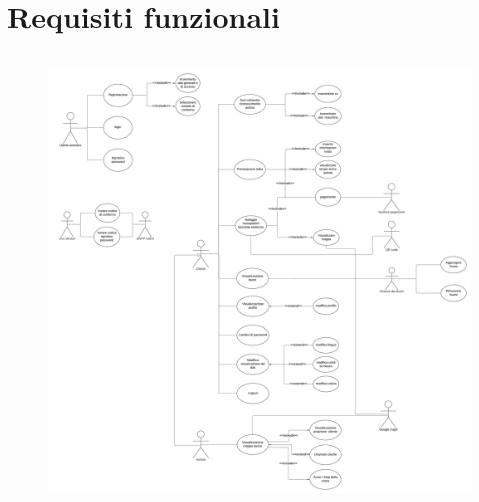 \chapter{Requisiti funzionali}

\begin{figure}[h]
    \centering
    \includegraphics[width=12cm, height=12cm]{immagini/completo.jpeg}
    \label{fig:completo}
\end{figure}